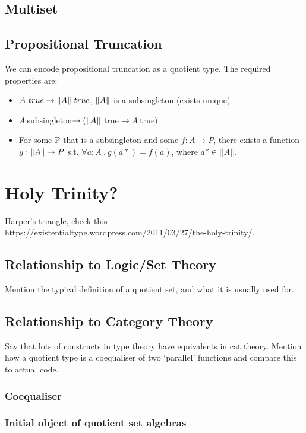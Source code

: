 \documentclass[11pt]{article}
\DeclarePairedDelimiter{\norm}{\lVert}{\rVert}
\begin{document}
\subsection{Multiset}
\subsection{Propositional Truncation}

We can encode propositional truncation as a quotient type. The required properties are:

\begin{itemize}
	\item $A \ true \rightarrow \norm{A} \ true$, $\norm{A}$ is a subsingleton (exists unique)
	\item $A  \ $subsingleton$ \rightarrow (\norm{A} \ $true$ \rightarrow A \ $true$)$
	\item For some P that is a subsingleton and some $f :  A \rightarrow P$, there exists a function $g : \norm{A} \rightarrow P$ s.t. $ \forall a : A \ . \ g(a*) = f(a)$, where $ a* \in ||A||$.
\end{itemize}

\section{Holy Trinity?}
Harper's triangle, check this https://existentialtype.wordpress.com/2011/03/27/the-holy-trinity/.

\subsection{Relationship to Logic/Set Theory}
Mention the typical definition of a quotient set, and what it is usually used for.

\subsection{Relationship to Category Theory}
Say that lots of constructs in type theory have equivalents in cat theory. Mention how a quotient type is a coequaliser of two `parallel' functions and compare this to actual code.


\subsubsection{Coequaliser}

\subsubsection{Initial object of quotient set algebras}
\end{document}

